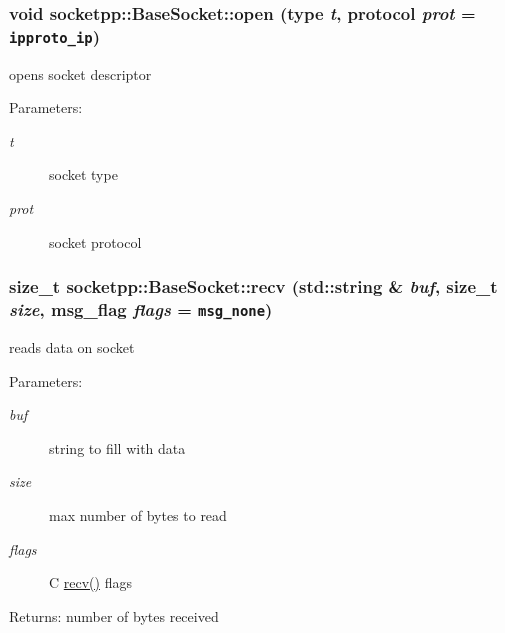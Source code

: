 \begin{CompactItemize}
{\subsubsection[{open}]{\setlength{\rightskip}{0pt plus 5cm}void socketpp::BaseSocket::open (type {\em t}, \/  protocol {\em prot} = {\tt ipproto\_\-ip})}}
\label{classsocketpp_1_1BaseSocket_2060dc1b648f83f8bf5ae3d9ecfcd619}


opens socket descriptor 

\begin{Desc}
\item[Parameters:]
\begin{description}
\item[{\em t}]socket type \item[{\em prot}]socket protocol \end{description}
\end{Desc}
\hypertarget{classsocketpp_1_1BaseSocket_d36a1139d9e931d172e9c45171609b66}{
\subsubsection[{recv}]{\setlength{\rightskip}{0pt plus 5cm}size\_\-t socketpp::BaseSocket::recv (std::string \& {\em buf}, \/  size\_\-t {\em size}, \/  msg\_\-flag {\em flags} = {\tt msg\_\-none})}}
\label{classsocketpp_1_1BaseSocket_d36a1139d9e931d172e9c45171609b66}


reads data on socket 

\begin{Desc}
\item[Parameters:]
\begin{description}
\item[{\em buf}]string to fill with data \item[{\em size}]max number of bytes to read \item[{\em flags}]C \hyperlink{classsocketpp_1_1BaseSocket_d74160ecc96cacec56f61d36f9ab747d}{recv()} flags \end{description}
\end{Desc}
\begin{Desc}
\item[Returns:]number of bytes received \end{Desc}
\hypertarget{classsocketpp_1_1BaseSocket_d74160ecc96cacec56f61d36f9ab747d}{
}
\end{CompactItemize}
